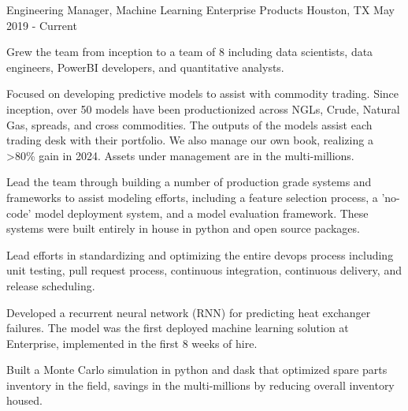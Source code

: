 
\begin{cventries}

\cventry
{Engineering Manager, Machine Learning} %
{Enterprise Products} %
{Houston, TX} %
{May 2019 - Current} %
{ %
\begin{cvitems}
\item {Grew the team from inception to a team of 8 including data scientists, data engineers, PowerBI developers, and quantitative analysts.}
\item {Focused on developing predictive models to assist with commodity trading. Since inception, over 50 models have been productionized across NGLs, Crude, Natural Gas, spreads, and cross commodities. The outputs of the models assist each trading desk with their portfolio. We also manage our own book, realizing a >80\% gain in 2024. Assets under management are in the multi-millions.}
\item {Lead the team through building a number of production grade systems and frameworks to assist modeling efforts, including a feature selection process, a 'no-code' model deployment system, and a model evaluation framework. These systems were built entirely in house in python and open source packages.}
\item {Lead efforts in standardizing and optimizing the entire devops process including unit testing, pull request process, continuous integration, continuous delivery, and release scheduling.}
\item {Developed a recurrent neural network (RNN) for predicting heat exchanger failures. The model was the first deployed machine learning solution at Enterprise, implemented in the first 8 weeks of hire.}
\item {Built a Monte Carlo simulation in python and dask that optimized spare parts inventory in the field, savings in the multi-millions by reducing overall inventory housed.}
\end{cvitems}
}


\end{cventries}
